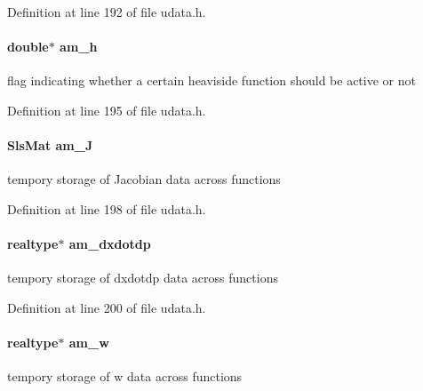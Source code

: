 Definition at line 192 of file udata.\+h.

\hypertarget{struct_user_data_a1a976a80dc74446059468485a0f279e1}{}
\paragraph[{am\+\_\+h}]{\setlength{\rightskip}{0pt plus 5cm}double$\ast$ am\+\_\+h}\label{struct_user_data_a1a976a80dc74446059468485a0f279e1}
flag indicating whether a certain heaviside function should be active or not 

Definition at line 195 of file udata.\+h.

\hypertarget{struct_user_data_a822be7d2872832008aa0b7c0282b04f6}{}
\paragraph[{am\+\_\+\+J}]{\setlength{\rightskip}{0pt plus 5cm}Sls\+Mat am\+\_\+\+J}\label{struct_user_data_a822be7d2872832008aa0b7c0282b04f6}
tempory storage of Jacobian data across functions 

Definition at line 198 of file udata.\+h.

\hypertarget{struct_user_data_a04716137a064f7c6d85c04aeb235b4f0}{}
\paragraph[{am\+\_\+dxdotdp}]{\setlength{\rightskip}{0pt plus 5cm}realtype$\ast$ am\+\_\+dxdotdp}\label{struct_user_data_a04716137a064f7c6d85c04aeb235b4f0}
tempory storage of dxdotdp data across functions 

Definition at line 200 of file udata.\+h.

\hypertarget{struct_user_data_a8ecd7286d3c2cd32378874fb1be8da37}{}
\paragraph[{am\+\_\+w}]{\setlength{\rightskip}{0pt plus 5cm}realtype$\ast$ am\+\_\+w}\label{struct_user_data_a8ecd7286d3c2cd32378874fb1be8da37}
tempory storage of w data across functions 


